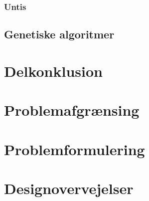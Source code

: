     \subsubsection{Untis}
     
     
     

   

  \subsection {Genetiske algoritmer}
    

\section{Delkonklusion}
    

\section{Problemafgrænsing}
    

\section{Problemformulering}
    

\section{Designovervejelser}
    
